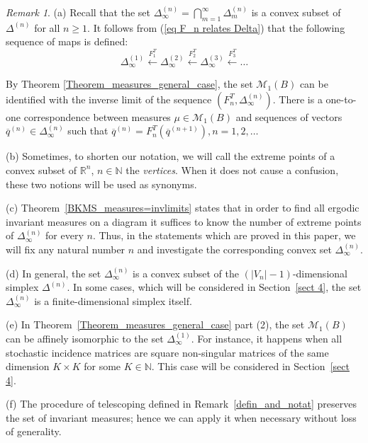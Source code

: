 \documentclass[11pt, english, reqno]{amsart}
\theoremstyle{definition}
\theoremstyle{remark}
\newtheorem{remar}[defin]{Remark}
\theoremstyle{plain}
\def\ov{\overline}
\numberwithin{equation}{section}
\begin{document}
\begin{remar}
(a) Recall that the set $\Delta_{\infty}^{(n)} = \bigcap_{m=1}^{\infty}
 \Delta_m^{(n)}$
is a convex subset of $\Delta^{(n)}$ for all $n \geq 1$.
It follows from (\ref{eq F_n relates Delta}) that  the following
sequence of maps is defined:
\begin{equation}\label{2.3a}
\Delta^{(1)}_{\infty} \stackrel{F_1^T}{\longleftarrow}
\Delta^{(2)}_{\infty} \stackrel{F^T_2}{\longleftarrow}
\Delta^{(3)}_{\infty} \stackrel{F^T_3}{\longleftarrow} \ldots
\end{equation}

By Theorem \ref{Theorem_measures_general_case}, the set
$\mathcal{M}_1(B)$ can be identified with the inverse limit of the
sequence $(F_n^T, \Delta^{(n)}_{\infty})$.
There is a one-to-one correspondence between  measures $\mu \in
\mathcal{M}_1(B)$ and  sequences of vectors $\ov q^{(n)} \in
\Delta_{\infty}^{(n)}$ such that $\ov q^{(n)} = F_n^T(\ov q^{(n+1)}),
n=1,2,\ldots$

(b) Sometimes, to shorten our notation, we will call the extreme points of a convex subset of
$\mathbb{R}^n$, $n \in \mathbb{N}$ the {\it vertices}. When it does not cause a confusion, these two notions will be used as synonyms.

(c) Theorem~\ref{BKMS_measures=invlimits} states that  in order to find
all ergodic  invariant measures on a diagram it suffices to know the
number of  extreme points of $\Delta^{(n)}_{\infty}$ for
 every $n$. Thus, in the statements which are  proved in this paper,
 we will fix any natural number  $n$ and investigate the corresponding
  convex set  $\Delta^{(n)}_{\infty}$.

(d) In general, the set $\Delta_\infty^{(n)}$ is a convex subset of the
$(|V_n| - 1)$-dimensional simplex $\Delta^{(n)}$. In some cases,
 which will be considered in Section~\ref{sect 4}, the set
 $\Delta_\infty^{(n)}$ is a finite-dimensional simplex itself.

(e)  In Theorem~\ref{Theorem_measures_general_case} part (2), the set
$\mathcal{M}_1(B)$ can be affinely isomorphic to the set
$\Delta_{\infty}^{(1)}$. For instance, it happens when all stochastic
incidence matrices are square non-singular matrices of the same dimension
$K \times K$ for some $K \in
\mathbb{N}$. This case will be considered in Section~\ref{sect 4}.

(f) The procedure of telescoping defined in Remark~\ref{defin_and_notat}
preserves the set of invariant measures; hence we can apply it when
necessary without loss of generality.
\end{remar}
\end{document}
